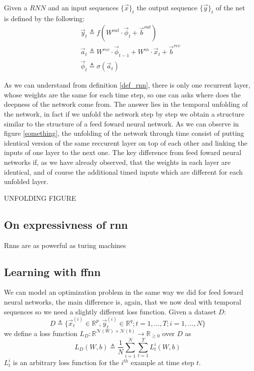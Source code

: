 Given a $RNN$ and an input sequences $\{\vec{x}\}_t$ the output sequence $\{\vec{y}\}_t$ of the net is defined by the following:
\begin{align}
&\vec{y}_t \triangleq f(W^{out}\cdot\vec{\phi}_t + \vec{b}^{out})\\
&\vec{a}_t \triangleq W^{rec}\cdot\vec{\phi}_{t-1}+W^{in}\cdot\vec{x}_t+\vec{b}^{rec}\\
&\vec{\phi}_t \triangleq  \sigma(\vec{a}_t)
\end{align}

As we can understand from definition \ref{def_rnn}, there is only one recurrent layer, whose weights are the same for each time step, so one can asks where does the deepness of the network come from.
The answer lies in the temporal unfolding of the network, in fact if we unfold the network step by step we obtain a structure similar to the structure of a feed foward neural network. As we can observe
in figure \ref{something}, the unfolding of the network through time consist of putting identical version of the same reccurent layer on top of each other and linking the inputs of one layer to the
next one. The key difference from feed foward neural networks if, as we have already observed, that the weights in each layer are identical, and of course the additional timed inputs which are different for
each unfolded layer.

UNFOLDING FIGURE

\subsection{On expressivness of rnn}
Rnns are as powerful as turing machines
\subsection{Learning with ffnn}
We can model an optimization problem in the same way we did for feed foward neural networks, the main difference is, again, that we now deal with temporal sequences so we need a slightly different
loss function.
Given a dataset $D$:
\begin{equation}
D\triangleq\{\vec{x}_t^{(i)} \in \mathbb{R}^p, \vec{y}_t^{(i)} \in \mathbb{R}^q; t=1,...,T;  i=1,...,N\}
\end{equation}
we define a loss function $L_D:\mathbb{R}^{\mathcal{N}(W)+\mathcal{N}(b)} \rightarrow \mathbb{R}_{\geq 0}$ over $D$  as
\begin{equation}
L_D(W,b)\triangleq\frac{1}{N}\sum_{i=1}^N \sum_{t=1}^T L_t^i(W,b) 
\end{equation}
$L_t^i$ is an arbitrary loss function for the $i^{th}$ example at time step $t$.









